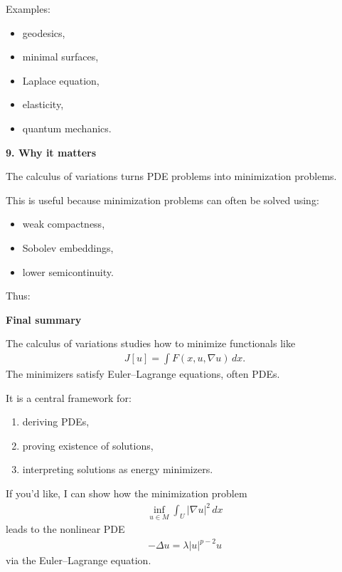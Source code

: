 \documentclass[12pt,a4paper]{report}
\begin{document}
\begin{description}
Examples:
	\begin{itemize}
    \item geodesics,
    \item minimal surfaces,
    \item Laplace equation,
    \item elasticity,
    \item quantum mechanics.
	\end{itemize}

\item \textbf{9. Why it matters}

The calculus of variations turns PDE problems into minimization problems.

This is useful because minimization problems can often be solved using:
	\begin{itemize}
    \item weak compactness,
    \item Sobolev embeddings,
    \item lower semicontinuity.
	\end{itemize}

Thus:

\> 

\item \textbf{Final summary}

The calculus of variations studies how to minimize functionals like
\begin{align*}
J[u]=\int F(x,u,\nabla u)\,dx.
\end{align*}
The minimizers satisfy Euler–Lagrange equations, often PDEs.

It is a central framework for:
\begin{enumerate}
\item deriving PDEs,
\item proving existence of solutions,
\item interpreting solutions as energy minimizers.
\end{enumerate}

If you'd like, I can show how the minimization problem
\begin{align*}
\inf_{u\in M}\int_U |\nabla u|^2\,dx
\end{align*}
leads to the nonlinear PDE
\begin{align*}
-\Delta u=\lambda |u|^{p-2}u
\end{align*}
via the Euler–Lagrange equation.


\end{description}
\end{document}
